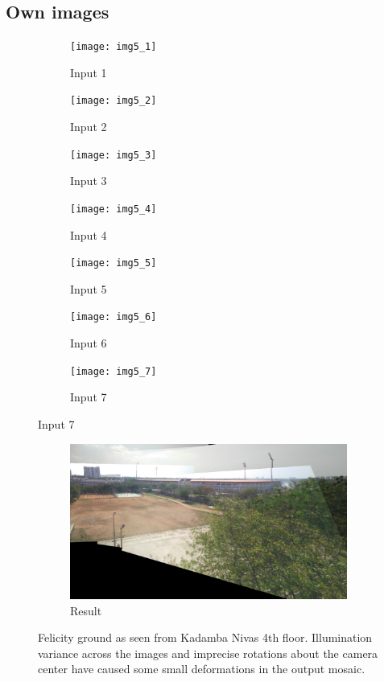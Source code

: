 \documentclass[a4paper,11]{article}
\begin{document}
  \subsection{Own images}
  
    \begin{figure}[H]
      \begin{subfigure}{.5\textwidth}
	\centering
	\texttt{[image: img5\_1]}
	\caption{Input 1}
      \end{subfigure}
      \begin{subfigure}{.5\textwidth}
	\centering
	\texttt{[image: img5\_2]}
	\caption{Input 2}
      \end{subfigure}
      \begin{subfigure}{0.5\textwidth}
	\centering
	\texttt{[image: img5\_3]}
	\caption{Input 3}
      \end{subfigure}
      \begin{subfigure}{0.5\textwidth}
	\centering
	\texttt{[image: img5\_4]}
	\caption{Input 4}
      \end{subfigure}

      \begin{subfigure}{0.5\textwidth}
	\centering
	\texttt{[image: img5\_5]}
	\caption{Input 5}
      \end{subfigure}
      \begin{subfigure}{0.5\textwidth}
	\centering
	\texttt{[image: img5\_6]}
	\caption{Input 6}
      \end{subfigure}
      
      \begin{subfigure}{\textwidth}
	\centering
	\texttt{[image: img5\_7]}
	\caption{Input 7}
      \end{subfigure}
       \end{figure}
      \begin{figure}\ContinuedFloat
      \begin{subfigure}{\textwidth}
	\centering
	\includegraphics[width=.8\linewidth]{mosaic5}
	\caption{Result}
      \end{subfigure}
      \caption{Felicity ground as seen from Kadamba Nivas 4th floor. Illumination variance across the images and imprecise rotations about the camera center have caused some small deformations in the output mosaic.}
    \end{figure}
\end{document}
